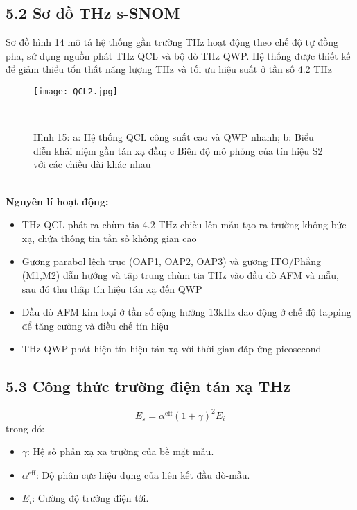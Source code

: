 \documentclass[a4paper,13pt]{article} %
\begin{document}
\subsection{5.2 Sơ đồ THz s-SNOM}
Sơ đồ hình 14 mô tả hệ thống gần trường THz hoạt động theo chế độ tự đồng pha, sử dụng nguồn phát THz QCL và bộ dò THz QWP. Hệ thống được thiết kế để giảm thiểu tổn thất năng lượng THz và tối ưu hiệu suất ở tần số 4.2 THz
\begin{figure}[htbp]
    \centering
\texttt{[image: QCL2.jpg]}
    \caption*{Hình 15: a: Hệ thống QCL công suất cao và QWP nhanh; b: Biểu diễn khái niệm gần tán xạ đầu; c Biên độ mô phỏng của tín hiệu S2 với các chiều dài khác nhau\cite{key5} } \\

    \label{fig:model}
\end{figure} \\
\textbf{Nguyên lí hoạt động:}
\begin{itemize}
\item THz QCL phát ra chùm tia 4.2 THz chiếu lên mẫu tạo ra trường không bức xạ, chứa thông tin tần số không gian cao
\item Gương parabol lệch trục (OAP1, OAP2, OAP3) và gương ITO/Phẳng (M1,M2) dẫn hướng và tập trung chùm tia THz vào đầu dò AFM và mẫu, sau đó thu thập tín hiệu tán xạ đến QWP
\item Đầu dò AFM kim loại ở tần số cộng hưởng 13kHz dao động ở chế độ tapping để tăng cường và điều chế tín hiệu
\item THz QWP phát hiện tín hiệu tán xạ với thời gian đáp ứng picosecond

\end{itemize}


\subsection{5.3 Công thức trường điện tán xạ THz}
\begin{equation}
E_s = \alpha^{\text{eff}} (1 + \gamma)^2 E_i  \tag{8}
\label{eq:scattered_field}
\end{equation}
trong đó:
\begin{itemize}
    \item \( \gamma \): Hệ số phản xạ xa trường của bề mặt mẫu.
    \item \( \alpha^{\text{eff}} \): Độ phân cực hiệu dụng của liên kết đầu dò-mẫu.
    \item \( E_i \): Cường độ trường điện tới.
\end{itemize}
\end{document}
